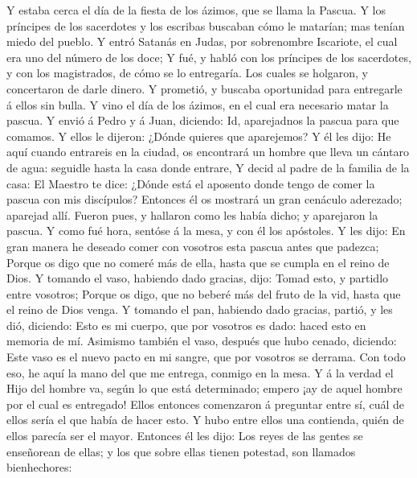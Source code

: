  Y estaba cerca el día de la fiesta de los ázimos, que se
llama la Pascua.  Y los príncipes de los sacerdotes y los
escribas buscaban cómo le matarían; mas tenían miedo del pueblo.
 Y entró Satanás en Judas, por sobrenombre Iscariote, el
cual era uno del número de los doce;  Y fué, y habló con los
príncipes de los sacerdotes, y con los magistrados, de cómo se lo
entregaría.  Los cuales se holgaron, y concertaron de darle
dinero.  Y prometió, y buscaba oportunidad para entregarle á
ellos sin bulla.  Y vino el día de los ázimos, en el cual
era necesario matar la pascua.  Y envió á Pedro y á Juan,
diciendo: Id, aparejadnos la pascua para que comamos.  Y
ellos le dijeron: ¿Dónde quieres que aparejemos?  Y él les
dijo: He aquí cuando entrareis en la ciudad, os encontrará un hombre que
lleva un cántaro de agua: seguidle hasta la casa donde entrare,
 Y decid al padre de la familia de la casa: El Maestro te
dice: ¿Dónde está el aposento donde tengo de comer la pascua con mis
discípulos?  Entonces él os mostrará un gran cenáculo
aderezado; aparejad allí.  Fueron pues, y hallaron como les
había dicho; y aparejaron la pascua.  Y como fué hora,
sentóse á la mesa, y con él los apóstoles.  Y les dijo: En
gran manera he deseado comer con vosotros esta pascua antes que padezca;
 Porque os digo que no comeré más de ella, hasta que se
cumpla en el reino de Dios.  Y tomando el vaso, habiendo
dado gracias, dijo: Tomad esto, y partidlo entre vosotros; 
Porque os digo, que no beberé más del fruto de la vid, hasta que el
reino de Dios venga.  Y tomando el pan, habiendo dado
gracias, partió, y les dió, diciendo: Esto es mi cuerpo, que por
vosotros es dado: haced esto en memoria de mí.  Asimismo
también el vaso, después que hubo cenado, diciendo: Este vaso es el
nuevo pacto en mi sangre, que por vosotros se derrama.  Con
todo eso, he aquí la mano del que me entrega, conmigo en la mesa.
 Y á la verdad el Hijo del hombre va, según lo que está
determinado; empero ¡ay de aquel hombre por el cual es entregado!
 Ellos entonces comenzaron á preguntar entre sí, cuál de
ellos sería el que había de hacer esto.  Y hubo entre ellos
una contienda, quién de ellos parecía ser el mayor. 
Entonces él les dijo: Los reyes de las gentes se enseñorean de ellas; y
los que sobre ellas tienen potestad, son llamados bienhechores:
